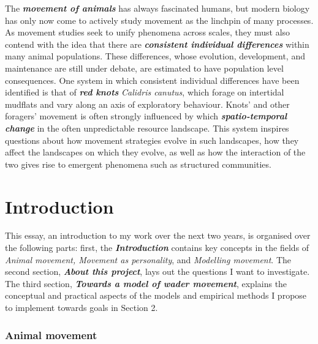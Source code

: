 The \textbf{\emph{movement of animals}} has always fascinated humans,
but modern biology has only now come to actively study movement as the
linchpin of many processes. As movement studies seek to unify phenomena
across scales, they must also contend with the idea that there are
\textbf{\emph{consistent individual differences}} within many animal
populations. These differences, whose evolution, development, and
maintenance are still under debate, are estimated to have population
level consequences. One system in which consistent individual
differences have been identified is that of \textbf{\emph{red knots}}
\emph{Calidris canutus}, which forage on intertidal mudflats and vary
along an axis of exploratory behaviour. Knots' and other foragers'
movement is often strongly influenced by which
\textbf{\emph{spatio-temporal change}} in the often unpredictable
resource landscape. This system inspires questions about how movement
strategies evolve in such landscapes, how they affect the landscapes on
which they evolve, as well as how the interaction of the two gives rise
to emergent phenomena such as structured communities.

\linenumbers

\part{Introduction}

This essay, an introduction to my work over the next two years, is
organised over the following parts: first, the
\textbf{\emph{Introduction}} contains key concepts in the fields of
\emph{Animal movement, Movement as personality}, and \emph{Modelling
movement}. The second section, \textbf{\emph{About this project}}, lays
out the questions I want to investigate. The third section,
\textbf{\emph{Towards a model of wader movement}}, explains the
conceptual and practical aspects of the models and empirical methods I
propose to implement towards goals in Section 2.

\section{Animal movement}

